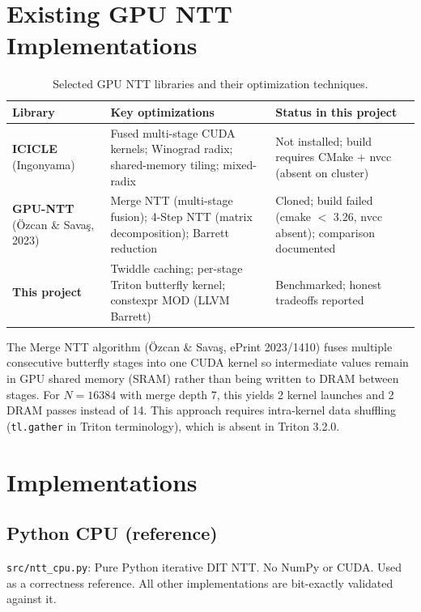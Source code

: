 \documentclass[11pt,a4paper]{article}
\begin{document}
\section{Existing GPU NTT Implementations}

\begin{table}[h]
\centering
\caption{Selected GPU NTT libraries and their optimization techniques.}
\begin{tabular}{L{3cm}L{4.5cm}L{5cm}}
\toprule
Library & Key optimizations & Status in this project \\
\midrule
\textbf{ICICLE} (Ingonyama) &
  Fused multi-stage CUDA kernels; Winograd radix; shared-memory tiling; mixed-radix &
  Not installed; build requires CMake + nvcc (absent on cluster) \\[4pt]
\textbf{GPU-NTT} (Özcan \& Savaş, 2023) &
  Merge NTT (multi-stage fusion); 4-Step NTT (matrix decomposition); Barrett reduction &
  Cloned; build failed (cmake $<$ 3.26, nvcc absent); comparison documented \\[4pt]
\textbf{This project} &
  Twiddle caching; per-stage Triton butterfly kernel; constexpr MOD (LLVM Barrett) &
  Benchmarked; honest tradeoffs reported \\
\bottomrule
\end{tabular}
\end{table}

The Merge NTT algorithm (Özcan \& Savaş, ePrint 2023/1410) fuses multiple consecutive
butterfly stages into one CUDA kernel so intermediate values remain in GPU shared memory
(SRAM) rather than being written to DRAM between stages. For $N = 16384$ with merge
depth 7, this yields 2 kernel launches and 2 DRAM passes instead of 14. This approach
requires intra-kernel data shuffling (\texttt{tl.gather} in Triton terminology), which
is absent in Triton 3.2.0.

\section{Implementations}

\subsection{Python CPU (reference)}

\texttt{src/ntt\_cpu.py}: Pure Python iterative DIT NTT. No NumPy or CUDA. Used as
a correctness reference. All other implementations are bit-exactly validated against it.
\end{document}
